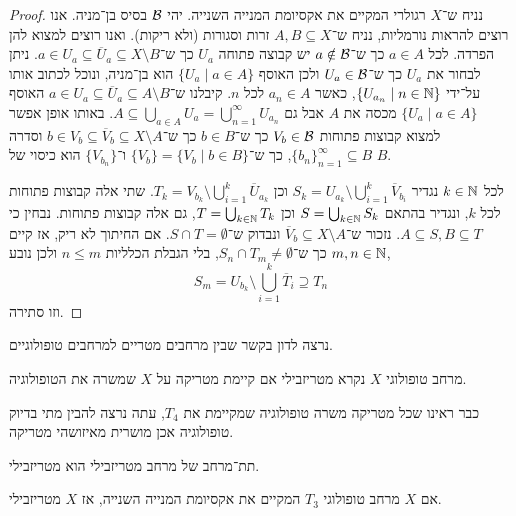 \begin{proof}
	נניח ש־$X$ רגולרי המקיים את אקסיומת המנייה השנייה.
	יהי $\mathcal{B}$ בסיס בן־מניה.
	אנו רוצים להראות נורמליות, נניח ש־$A, B \subseteq X$ זרות וסגורות (ולא ריקות).
	ואנו רוצים למצוא להן הפרדה.
	לכל $a \in A$ כך ש־$a \notin \mathcal{B}$ יש קבוצה פתוחה $U_a$ כך ש־$a \in U_a \subseteq \overline{U}_a \subseteq X \setminus B$.
	ניתן לבחור את $U_a$ כך ש־$U_a \in \mathcal{B}$ ולכן האוסף $\{ U_a \mid a \in A \}$ הוא בן־מניה, ונוכל לכתוב אותו על־ידי $\{ U_{a_n} \mid n \in \mathbb{N} \}$, כאשר $a_n \in A$ לכל $n$.
	קיבלנו ש־$a \in U_a \subseteq \overline{U}_a \subseteq A \setminus B$
	האוסף $\{ U_a \mid a \in A \}$ מכסה את $A$ אבל גם $A \subseteq \bigcup_{a \in A} U_a = \bigcup_{n = 1}^\infty U_{a_n}$.
	באותו אופן אפשר למצוא קבוצות פתוחות $V_b \in \mathcal{B}$ כך ש־$b \in B$ כך ש־$b \in V_b \subseteq \overline{V}_b \subseteq X \setminus A$ וסדרה ${\{ b_n \}}_{n = 1}^\infty \subseteq B$,
	כך ש־$\{ V_b \} = \{ V_b \mid b \in B \}$ ו־$\{ V_{b_n} \}$ הוא כיסוי של $B$.

	לכל $k \in \mathbb{N}$ נגדיר $S_k = U_{a_k} \setminus \bigcup_{i = 1}^k \overline{V}_{b_i}$ וכן $T_k = V_{b_k} \setminus \bigcup_{i = 1}^k \overline{U}_{a_k}$.
	שתי אלה קבוצות פתוחות לכל $k$, ונגדיר בהתאם $S = \bigcup_{k \in \mathbb{N}} S_k$ וכן $T = \bigcup_{k \in \mathbb{N}} T_k$, גם אלה קבוצות פתוחות.
	נבחין כי $A \subseteq S, B \subseteq T$.
	נזכור ש־$\overline{V}_b \subseteq X \setminus A$ ונבדוק ש־$S \cap T = \emptyset$.
	אם החיתוך לא ריק, אז קיים$m, n \in \mathbb{N}$ כך ש־$S_n \cap T_m \ne \emptyset$, בלי הגבלת הכלליות $n \le m$ ולכן נובע,
	\[
		S_m = U_{b_k} \setminus \bigcup_{i = 1}^k \overline{T}_i \supseteq T_n
	\]
	וזו סתירה.
\end{proof}
נרצה לדון בקשר שבין מרחבים מטריים למרחבים טופולוגיים.
\begin{definition}
	מרחב טופולוגי $X$ נקרא מטריזבילי אם קיימת מטריקה על $X$ שמשרה את הטופולוגיה.
\end{definition}
כבר ראינו שכל מטריקה משרה טופולוגיה שמקיימת את $T_4$, עתה נרצה להבין מתי בדיוק טופולוגיה אכן מושרית מאיזושהי מטריקה.
\begin{remark}
	תת־מרחב של מרחב מטריזבילי הוא מטריזבילי.
\end{remark}
\begin{theorem}
	אם $X$ מרחב טופולוגי $T_3$ המקיים את אקסיומת המנייה השנייה,
	אז $X$ מטריזבילי.
\end{theorem}
